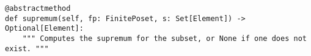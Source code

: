 \par\begin{minipage}{80ex}
\begin{verbatim}
@abstractmethod
def supremum(self, fp: FinitePoset, s: Set[Element]) -> Optional[Element]:
    """ Computes the supremum for the subset, or None if one does not exist. """
\end{verbatim}
\end{minipage}\par